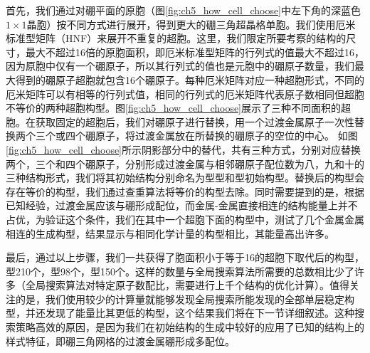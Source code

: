 首先，我们通过对硼平面的原胞（图\ref{fig:ch5_how_cell_choose}中左下角的深蓝色$1\times 1$晶胞）按不同方式进行展开，得到更大的硼三角超晶格单胞。我们使用厄米标准型矩阵（HNF）\cite{hart2008algorithm}来展开不重复的超胞。这里，我们限定所要考察的结构的尺寸，最大不超过\num{16}倍的原胞面积，即厄米标准型矩阵的行列式的值最大不超过\num{16}，因为原胞中仅有一个硼原子，所以其行列式的值也是元胞中的硼原子数量，我们最大得到的硼原子超胞就包含\num{16}个硼原子。每种厄米矩阵对应一种超胞形式，不同的厄米矩阵可以有相等的行列式值，相同的行列式的厄米矩阵代表原子数相同但超胞不等价的两种超胞构型。图\ref{fig:ch5_how_cell_choose}展示了三种不同面积的超胞。在获取固定的超胞后，我们对硼原子进行替换，用一个过渡金属原子一次性替换两个三个或四个硼原子，将过渡金属放在所替换的硼原子的空位的中心。
如图\ref{fig:ch5_how_cell_choose}所示阴影部分中的替代，共有三种方式，分别对应替换两个，三个和四个硼原子，分别形成过渡金属与相邻硼原子配位数为八，九和十的三种结构形式，我们将其初始结构分别命名为型型和型初始构型。替换后的构型会存在等价的构型，我们通过查重算法将等价的构型去除。同时需要提到的是，根据已知经验，过渡金属应该与硼形成配位，而金属-金属直接相连的结构能量上并不占优，为验证这个条件，我们在其中一个超胞下面的构型中，测试了几个金属金属相连的生成构型，结果显示与相同化学计量的构型相比，其能量高出许多。

最后，通过以上步骤，我们一共获得了胞面积小于等于16的超胞下取代后的构型，型\num{210}个，型\num{98}个，型\num{150}个。这样的数量与全局搜索算法所需要的总数相比少了许多（全局搜索算法对特定原子数配比，需要进行上千个结构的优化计算）。值得关注的是，我们使用较少的计算量就能够发现全局搜索所能发现的全部单层稳定构型，并还发现了能量比其更低的构型，这个结果我们将在下一节详细叙述。这种搜索策略高效的原因，是因为我们在初始结构的生成中较好的应用了已知的结构上的样式特征，即硼三角网格的过渡金属硼形成多配位。

